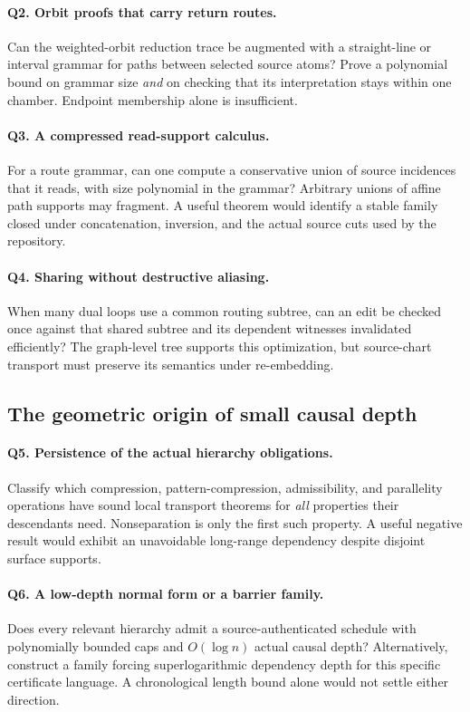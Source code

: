 \documentclass[11pt]{article}
\theoremstyle{definition}
\begin{document}
\paragraph{Q2. Orbit proofs that carry return routes.}
Can the weighted-orbit reduction trace be augmented with a straight-line or interval grammar for paths between selected source atoms? Prove a polynomial bound on grammar size \emph{and} on checking that its interpretation stays within one chamber. Endpoint membership alone is insufficient.

\paragraph{Q3. A compressed read-support calculus.}
For a route grammar, can one compute a conservative union of source incidences that it reads, with size polynomial in the grammar? Arbitrary unions of affine path supports may fragment. A useful theorem would identify a stable family closed under concatenation, inversion, and the actual source cuts used by the repository.

\paragraph{Q4. Sharing without destructive aliasing.}
When many dual loops use a common routing subtree, can an edit be checked once against that shared subtree and its dependent witnesses invalidated efficiently? The graph-level tree supports this optimization, but source-chart transport must preserve its semantics under re-embedding.

\subsection{The geometric origin of small causal depth}
\paragraph{Q5. Persistence of the actual hierarchy obligations.}
Classify which compression, pattern-compression, admissibility, and parallelity operations have sound local transport theorems for \emph{all} properties their descendants need. Nonseparation is only the first such property. A useful negative result would exhibit an unavoidable long-range dependency despite disjoint surface supports.

\paragraph{Q6. A low-depth normal form or a barrier family.}
Does every relevant hierarchy admit a source-authenticated schedule with polynomially bounded caps and $O(\log n)$ actual causal depth? Alternatively, construct a family forcing superlogarithmic dependency depth for this specific certificate language. A chronological length bound alone would not settle either direction.
\end{document}
